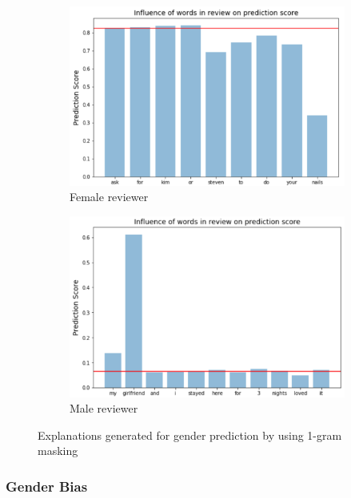 \begin{figure}[t]
	\centering
	\begin{subfigure}{0.45\textwidth}
		\centering
		\includegraphics[width=\linewidth]{figure7}
		\caption{Female reviewer}
		\label{fig:gp:mask:female}
	\end{subfigure} %
	\begin{subfigure}{0.45\textwidth}
		\centering
		\includegraphics[width=\linewidth]{figure6}
		\caption{Male reviewer}
		\label{fig:gp:mask:male}
	\end{subfigure}
	\caption{Explanations generated for gender prediction by using 1-gram masking}
	\label{fig:gp:mask}
\end{figure}

\subsubsection{Gender Bias}

